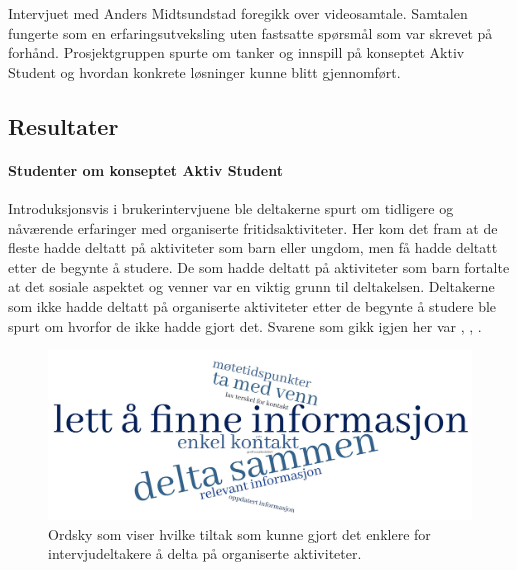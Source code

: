 Intervjuet med Anders Midtsundstad foregikk over videosamtale. Samtalen fungerte som en erfaringsutveksling uten fastsatte spørsmål som var skrevet på forhånd. Prosjektgruppen spurte om tanker og innspill på konseptet Aktiv Student og hvordan konkrete løsninger kunne blitt gjennomført.

\vspace{5mm} %


\subsection{Resultater}

\paragraph{Studenter om konseptet Aktiv Student}
Introduksjonsvis i brukerintervjuene ble deltakerne spurt om tidligere og nåværende erfaringer med organiserte fritidsaktiviteter. Her kom det fram at de fleste hadde deltatt på aktiviteter som barn eller ungdom, men få hadde deltatt etter de begynte å studere. De som hadde deltatt på aktiviteter som barn fortalte at det sosiale aspektet og venner var en viktig grunn til deltakelsen. Deltakerne som ikke hadde deltatt på organiserte aktiviteter etter de begynte å studere ble spurt om hvorfor de ikke hadde gjort det. Svarene som gikk igjen her var , , .

\begin{figure}[H]
\includegraphics[width=\textwidth]{Illustrasjoner/ordsky-tiltak.jpg}
\caption{Ordsky som viser hvilke tiltak som kunne gjort det enklere for intervjudeltakere å delta på organiserte aktiviteter.}
\label{fig:ordsky-tiltak}
\end{figure}

